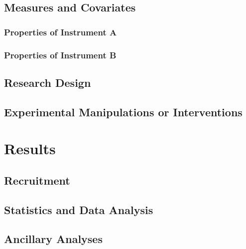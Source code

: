 \documentclass[a4paper,man,apacite,natbib,12pt]{apa6}\usepackage[]{graphicx}\usepackage[]{color}
\begin{document}
\subsection{Measures and Covariates}


\subsubsection{Properties of Instrument A}


\subsubsection{Properties of Instrument B}


\subsection{Research Design}


\subsection{Experimental Manipulations or Interventions}


\section{Results}


\subsection{Recruitment}


\subsection{Statistics and Data Analysis}


\subsection{Ancillary Analyses}

\end{document}
